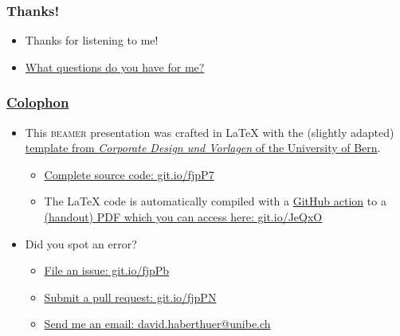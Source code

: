 \begin{frame}%
  \frametitle{Thanks!}%
  \begin{itemize}%
    \item Thanks for listening to me!%
    \item<2-> \href{https://mannerofspeaking.org/2019/12/29/what-questions-do-you-have-for-me/}{What questions do you have for me?}%
  \end{itemize}%
\end{frame}

\begin{frame}
  \frametitle{\href{https://en.wikipedia.org/wiki/Colophon_(publishing)}{Colophon}}
  \begin{itemize}
    \item This \textsc{beamer} presentation was crafted in \LaTeX\xspace with the (slightly adapted) \href{http://intern.unibe.ch/dienstleistungen/corporate_design_und_vorlagen/praesentationen/index_ger.html}{template from \emph{Corporate Design und Vorlagen} of the University of Bern}.
      \begin{itemize}
        \item \href{https://github.com/habi/lecture.microtomography/}{Complete source code: git.io/fjpP7}
        \item The \LaTeX\xspace code is automatically compiled with a \href{https://github.com/actions}{GitHub action} to a \href{https://habi.github.io/Lecture.Microtomography/XRayMicroTomography.Handout.pdf}{(handout) PDF which you can access here: git.io/JeQxO}
      \end{itemize}
    \item Did you spot an error?
      \begin{itemize}
        \item \href{https://github.com/habi/lecture.microtomography/issues}{File an issue: git.io/fjpPb}
        \item \href{https://github.com/habi/lecture.microtomography/pulls}{Submit a pull request: git.io/fjpPN}
        \item \href{mailto:david.haberthuer@unibe.ch?subject=Error\%20in\%20the\%20(micro)-tomography\%20lecture\&body=https://xkcd.com/386/}{Send me an email: david.haberthuer@unibe.ch}
      \end{itemize}
  \end{itemize}
\end{frame}




